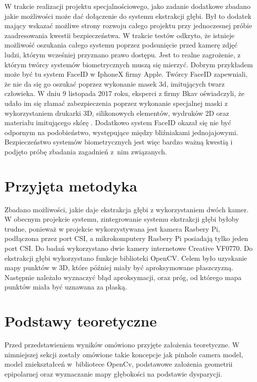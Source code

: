 \documentclass[oneside, eng]{mgr}
\begin{document}
W trakcie realizacji projektu specjalnościowego, jako zadanie dodatkowe zbadano jakie możliwości może dać dołączenie do systemu ekstrakcji głębi. Był to dodatek mający wskazać możliwe strony rozwoju całego projektu przy jednoczesnej próbie zaadresowania kwestii bezpieczeństwa. W trakcie testów odkryto, że istnieje możliwość oszukania całego systemu poprzez podsunięcie przed kamerę zdjęć ludzi, którym wcześniej przyznano prawo dostępu. Jest to realne zagrożenie, z którym twórcy systemów biometrycznych muszą się mierzyć. Dobrym przykładem może być tu system FaceID w IphoneX firmy Apple. Twórcy FaceID zapewniali, że nie da się go oszukać poprzez wykonanie masek 3d, imitujących twarz człowieka. W dniu 9 listopada 2017 roku, eksperci z firmy Bkav oświadczyli, że udało im się złamać zabezpieczenia poprzez wykonanie specjalnej maski z wykorzystaniem drukarki 3D, silikonowych elementów, wydruków 2D oraz materiału imitującego skórę \cite{FaceID hacked}. Dodatkowo system FaceID okazał się nie być odpornym na podobieństwo, występujące między bliźniakami jednojajowymi. Bezpieczeństwo systemów biometrycznych jest więc bardzo ważną kwestią i podjęto próbę zbadania zagadnień z~nim związanych.

\section{Przyjęta metodyka}
Zbadano możliwości, jakie daje ekstrakcja głębi z wykorzystaniem dwóch kamer. W obecnym projekcie systemu, zintegrowanie systemu ekstrakcji głębi byłoby trudne, ponieważ w projekcie wykorzystywana jest kamera Rasbery Pi, podłączona przez port CSI, a mikrokomputery Rasbery Pi posiadają tylko jeden port CSI. Do badań wykorzystano dwie kamery internetowe Creative VF0770. Do ekstrakcji głębi wykorzystano funkcje biblioteki OpenCV. Celem było uzyskanie mapy punktów w 3D, które później miały być aproksymowane płaszczyzną. Następnie należało wyznaczyć błąd aproksymacji, oraz próg, od którego mapa punktów miała być uznawana za płaską.

\section{Podstawy teoretyczne}

Przed przedstawieniem wyników omówiono przyjęte założenia teoretyczne. W nimniejszej sekcji zostały omówione takie koncepcje jak pinhole camera model, model zniekształceń w~bibliotece OpenCv, podstawowe założenia geometrii epipolarnej oraz wyznaczanie mapy głębokości na podstawie dysparycji.
\end{document}
